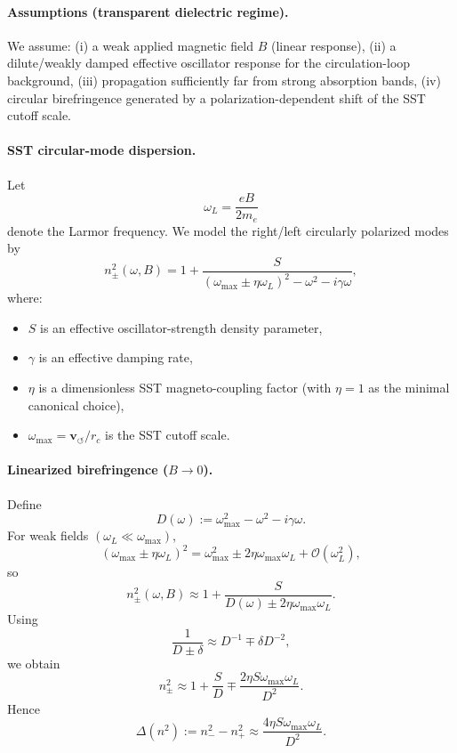 \documentclass[10pt]{article}
\begin{document}
        \paragraph{Assumptions (transparent dielectric regime).}
            We assume:
            (i) a weak applied magnetic field \(B\) (linear response),
            (ii) a dilute/weakly damped effective oscillator response for the circulation-loop background,
            (iii) propagation sufficiently far from strong absorption bands,
            (iv) circular birefringence generated by a polarization-dependent shift of the SST cutoff scale.
        
        \paragraph{SST circular-mode dispersion.}
            Let
            \[
                \omega_L=\frac{eB}{2m_e}
            \]
            denote the Larmor frequency. We model the right/left circularly polarized modes by
            \[
                n_\pm^2(\omega,B)
                =
                1+\frac{S}{(\omega_{\max}\pm \eta \omega_L)^2-\omega^2-i\gamma\omega},
            \]
            where:
            \begin{itemize}
                \item \(S\) is an effective oscillator-strength density parameter,
                \item \(\gamma\) is an effective damping rate,
                \item \(\eta\) is a dimensionless SST magneto-coupling factor (with \(\eta=1\) as the minimal canonical choice),
                \item \(\omega_{\max}=\mathbf{v}_{\!\boldsymbol{\circlearrowleft}}/r_c\) is the SST cutoff scale.
            \end{itemize}
        
        \paragraph{Linearized birefringence (\(B\to 0\)).}
            Define
            \[
                D(\omega):=\omega_{\max}^2-\omega^2-i\gamma\omega.
            \]
            For weak fields \((\omega_L\ll \omega_{\max})\),
            \[
                (\omega_{\max}\pm \eta\omega_L)^2
                =
                \omega_{\max}^2 \pm 2\eta\omega_{\max}\omega_L + \mathcal{O}(\omega_L^2),
            \]
            so
            \[
                n_\pm^2(\omega,B)
                \approx
                1+\frac{S}{D(\omega)\pm 2\eta\omega_{\max}\omega_L}.
            \]
            Using
            \[
                \frac{1}{D\pm \delta}\approx D^{-1}\mp \delta D^{-2},
            \]
            we obtain
            \[
                n_\pm^2
                \approx
                1+\frac{S}{D}
                \mp
                \frac{2\eta S\omega_{\max}\omega_L}{D^2}.
            \]
            Hence
            \[
                \Delta(n^2):=n_-^2-n_+^2
                \approx
                \frac{4\eta S\omega_{\max}\omega_L}{D^2}.
            \]
            
\end{document}
